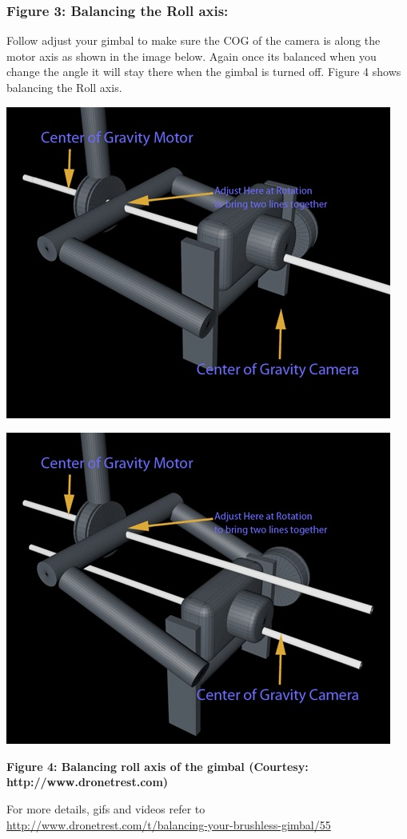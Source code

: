 \documentclass[11pt,a4paper]{article}
\begin{document}
			\subsubsection{Figure 3: Balancing the Roll axis:}
			Follow adjust your gimbal to make sure the COG of the camera is along the motor axis as shown in the image below. Again once its balanced when you change the angle it will stay there when the gimbal is turned off. Figure 4 shows balancing the Roll axis.
			\newline
			\begin{center}
				\includegraphics[scale=0.7]{../Images/balancing_roll_1.jpg}
			\end{center}
			\begin{center}
				\includegraphics[scale=0.7]{../Images/balancing_roll_2.jpg}
			\end{center}
			\begin{center}
				\textbf{Figure 4: Balancing roll axis of the gimbal (Courtesy: http://www.dronetrest.com)}
			\end{center}
			For more details, gifs and videos refer to
			\newline
			\url{http://www.dronetrest.com/t/balancing-your-brushless-gimbal/55}
			
\end{document}
